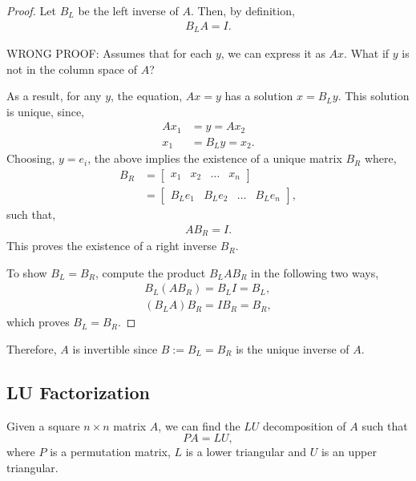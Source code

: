 \documentclass{amsart}
\theoremstyle{plain}
\numberwithin{equation}{section}
\begin{document}
\begin{proof}
Let $B_L$ be the left inverse of $A$. Then, by definition, 
\begin{align*}
B_LA = I.
\end{align*}

WRONG PROOF: Assumes that for each $y$, we can express it as $Ax$. What if 
$y$ is not in the column space of $A$?

As a result, for any $y$, the equation, $Ax = y$ has a solution $x = B_Ly$.
This solution is unique, since,  
\begin{align*}
Ax_1 &= y = Ax_2\\
x_1 &= B_Ly = x_2.
\end{align*}
Choosing, $y=e_i$, the above implies the existence of a 
unique matrix $B_R$ where, 
\begin{align*}
B_R &= 
\begin{bmatrix}
x_1 & x_2 & \ldots & x_n
\end{bmatrix}\\
&= 
\begin{bmatrix}
B_L e_1 & B_L e_2 & \ldots & B_L e_n
\end{bmatrix},
\end{align*}
such that,
\begin{align*}
AB_R = I.
\end{align*}
This proves the existence of a right inverse $B_R$.

To show $B_L = B_R$, compute the product $B_LAB_R$ in the 
following two ways,
\begin{align*}
B_L (A B_R) = B_L I = B_L,\\
(B_L A) B_R  = I B_R = B_R,
\end{align*}
which proves $B_L = B_R$. 
\end{proof}

Therefore, $A$ is invertible since $B := B_L = B_R$ is the 
unique inverse of $A$. 



\subsection{LU Factorization}
Given a square $n \times n$ matrix $A$, we can find the $LU$ decomposition 
of $A$ such that 
\begin{equation}
PA = LU,
\label{eq:LU}
\end{equation}
where $P$ is a permutation matrix, $L$ is a lower triangular
and $U$ is an upper triangular.
\end{document}
